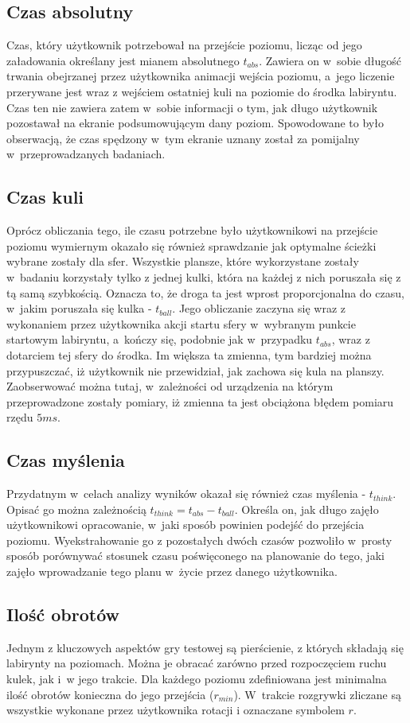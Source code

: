\documentclass[a4paper,12pt,numbers=noenddot]{report}
\begin{document}
	\subsection{Czas absolutny}
Czas, który użytkownik potrzebował na przejście poziomu, licząc od jego załadowania określany jest mianem absolutnego $t_{abs}$. Zawiera on w~sobie długość trwania obejrzanej przez użytkownika animacji wejścia poziomu, a~jego liczenie przerywane jest wraz z wejściem ostatniej kuli na poziomie do środka labiryntu. Czas ten nie zawiera zatem w~sobie informacji o tym, jak długo użytkownik pozostawał na ekranie podsumowującym dany poziom. Spowodowane to było obserwacją, że czas spędzony w~tym ekranie uznany został za pomijalny w~przeprowadzanych badaniach.
	\subsection{Czas kuli}
Oprócz obliczania tego, ile czasu potrzebne było użytkownikowi na przejście poziomu wymiernym okazało się również sprawdzanie jak optymalne ścieżki wybrane zostały dla sfer. Wszystkie plansze, które wykorzystane zostały w~badaniu korzystały tylko z jednej kulki, która na każdej z nich poruszała się z tą samą szybkością. Oznacza to, że droga ta jest wprost proporcjonalna do czasu, w~jakim poruszała się kulka - $t_{ball}$. Jego obliczanie zaczyna się wraz z wykonaniem przez użytkownika akcji startu sfery w~wybranym punkcie startowym labiryntu, a~kończy się, podobnie jak w~przypadku $t_{abs}$, wraz z dotarciem tej sfery do środka. Im większa ta zmienna, tym bardziej można przypuszczać, iż użytkownik nie przewidział, jak zachowa się kula na planszy. Zaobserwować można tutaj, w~zależności od urządzenia na którym przeprowadzone zostały pomiary, iż zmienna ta jest obciążona błędem pomiaru rzędu $5 ms$.
	\subsection{Czas myślenia}
Przydatnym w~celach analizy wyników okazał się również czas myślenia - $t_{think}$. Opisać go można zależnością $t_{think} = t_{abs} - t_{ball}$. Określa on, jak długo zajęło użytkownikowi opracowanie, w~jaki sposób powinien podejść do przejścia poziomu. Wyekstrahowanie go z pozostałych dwóch czasów pozwoliło w~prosty sposób porównywać stosunek czasu poświęconego na planowanie do tego, jaki zajęło wprowadzanie tego planu w~życie przez danego użytkownika.
	\subsection{Ilość obrotów}
Jednym z kluczowych aspektów gry testowej są pierścienie, z których składają się labirynty na poziomach. Można je obracać zarówno przed rozpoczęciem ruchu kulek, jak i~w jego trakcie. Dla każdego poziomu zdefiniowana jest minimalna ilość obrotów konieczna do jego przejścia ($r_{min}$). W~trakcie rozgrywki zliczane są wszystkie wykonane przez użytkownika rotacji i oznaczane symbolem $r$. 
\end{document}
